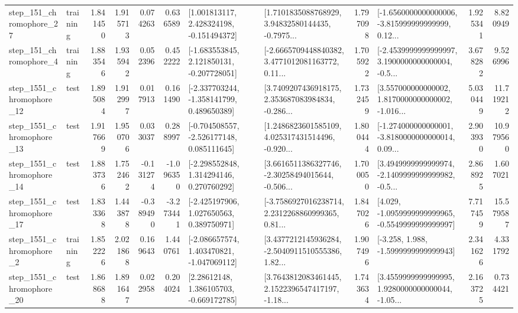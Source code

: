 \begin{tabular}{llrrrrllrlrr}
  step\_151\_chromophore\_27 &  training &      1.841450 &    1.915713 &      0.074263 &  0.636589 &    [1.001813117, 2.428324198, -0.151494372] &  [1.7101835088768929, 3.94832580144435, -0.7975... &       1.797098 &  [-1.6560000000000006, -3.815999999999999, 0.12... &            1.925341 &          8.820949 \\
   step\_151\_chromophore\_4 &  training &      1.883546 &    1.935942 &      0.052396 &  0.452222 &   [-1.683553845, 2.121850131, -0.207728051] &  [-2.6665709448840382, 3.4771012081163772, 0.11... &       1.705922 &  [-2.4539999999999997, 3.1900000000000004, -0.5... &            3.678282 &          9.526996 \\
 step\_1551\_chromophore\_12 &      test &      1.895084 &    1.912997 &      0.017913 &  0.161490 &   [-2.337703244, -1.358141799, 0.489650389] &  [3.7409207436918175, 2.353687083984834, -0.286... &       1.732459 &  [3.557000000000002, 1.8170000000000002, -1.016... &            5.030449 &         11.719212 \\
 step\_1551\_chromophore\_13 &      test &      1.917669 &    1.950706 &      0.033037 &  0.288997 &   [-0.704508557, -2.526177148, 0.085111645] &  [1.2486823601585109, 4.025317431514496, -0.920... &       1.800444 &  [-1.274000000000001, -3.8180000000000014, 0.09... &            2.903930 &         10.979560 \\
 step\_1551\_chromophore\_14 &      test &      1.883736 &    1.752462 &     -0.131274 & -1.096350 &    [-2.298552848, 1.314294146, 0.270760292] &  [3.6616511386327746, -2.30258494015644, -0.506... &       1.700050 &  [3.4949999999999974, -2.1409999999999982, -0.5... &            2.868925 &          1.607021 \\
 step\_1551\_chromophore\_17 &      test &      1.833368 &    1.443878 &     -0.389490 & -3.273441 &    [-2.425197906, 1.027650563, 0.389750971] &  [-3.7586927016238714, 2.2312268860999365, 0.81... &       1.847026 &  [4.029, -1.0959999999999965, -0.5549999999999997] &            7.717459 &         15.579587 \\
  step\_1551\_chromophore\_2 &  training &      1.852226 &    2.021868 &      0.169643 &  1.440761 &   [-2.086657574, 1.403470821, -1.047069112] &  [3.4377212145936284, -2.5040911510555386, 1.82... &       1.907496 &               [-3.258, 1.988, -1.5999999999999943] &            2.341626 &          4.331792 \\
 step\_1551\_chromophore\_20 &      test &      1.868688 &    1.891647 &      0.022958 &  0.204024 &     [2.28612148, 1.386105703, -0.669172785] &  [3.7643812083461445, 2.1522396547417197, -1.18... &       1.743634 &  [3.4559999999999995, 1.9280000000000044, -1.05... &            2.163725 &          0.734421 \\

\end{tabular}
